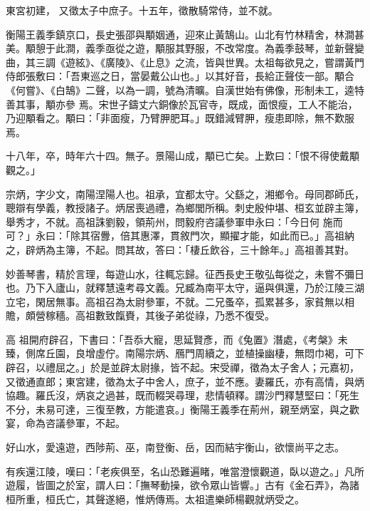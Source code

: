 \begin{pinyinscope}
 東宮初建，
 又徵太子中庶子。十五年，徵散騎常侍，並不就。



 衡陽王義季鎮京口，長史張邵與顒姻通，迎來止黃鵠山。山北有竹林精舍，林澗甚美。顒憩于此澗，義季亟從之遊，顒服其野服，不改常度。為義季鼓琴，並新聲變曲，其三調《遊絃》、《廣陵》、《止息》之流，皆與世異。太祖每欲見之，嘗謂黃門侍郎張敷曰：「吾東巡之日，當晏戴公山也。」以其好音，長給正聲伎一部。顒合《何嘗》、《白鵠》二聲，以為一調，號為清曠。自漢世始有佛像，形制未工，逵特善其事，顒亦參
 焉。宋世子鑄丈六銅像於瓦官寺，既成，面恨瘦，工人不能治，乃迎顒看之。顒曰：「非面瘦，乃臂胛肥耳。」既錯減臂胛，瘦患即除，無不歎服焉。



 十八年，卒，時年六十四。無子。景陽山成，顒已亡矣。上歎曰：「恨不得使戴顒觀之。」



 宗炳，字少文，南陽涅陽人也。祖承，宜都太守。父繇之，湘鄉令。母同郡師氏，聰辯有學義，教授諸子。炳居喪過禮，為鄉閭所稱。刺史殷仲堪、桓玄並辟主簿，舉秀才，不就。高祖誅劉毅，領荊州，問毅府咨議參軍申永曰：「今日何
 施而可？」永曰：「除其宿釁，倍其惠澤，貫敘門次，顯擢才能，如此而已。」高祖納之，辟炳為主簿，不起。問其故，答曰：「棲丘飲谷，三十餘年。」高祖善其對。



 妙善琴書，精於言理，每遊山水，往輒忘歸。征西長史王敬弘每從之，未嘗不彌日也。乃下入廬山，就釋慧遠考尋文義。兄臧為南平太守，逼與俱還，乃於江陵三湖立宅，閑居無事。高祖召為太尉參軍，不就。二兄蚤卒，孤累甚多，家貧無以相贍，頗營稼穡。高祖數致餼賚，其後子弟從祿，乃悉不復受。



 高
 祖開府辟召，下書曰：「吾忝大寵，思延賢彥，而《兔置》潛處，《考槃》未臻，側席丘園，良增虛佇。南陽宗炳、鴈門周續之，並植操幽棲，無悶巾褐，可下辟召，以禮屈之。」於是並辟太尉掾，皆不起。宋受禪，徵為太子舍人；元嘉初，又徵通直郎；東宮建，徵為太子中舍人，庶子，並不應。妻羅氏，亦有高情，與炳協趣。羅氏沒，炳哀之過甚，既而輟哭尋理，悲情頓釋。謂沙門釋慧堅曰：「死生不分，未易可達，三復至教，方能遣哀。」衡陽王義季在荊州，親至炳室，與之歡
 宴，命為咨議參軍，不起。



 好山水，愛遠遊，西陟荊、巫，南登衡、岳，因而結宇衡山，欲懷尚平之志。



 有疾還江陵，嘆曰：「老疾俱至，名山恐難遍睹，唯當澄懷觀道，臥以遊之。」凡所遊履，皆圖之於室，謂人曰：「撫琴動操，欲令眾山皆響。」古有《金石弄》，為諸桓所重，桓氏亡，其聲遂絕，惟炳傳焉。太祖遣樂師楊觀就炳受之。




\end{pinyinscope}
